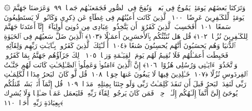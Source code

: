  ۞ وَتَرَكنَا بَعضَهُم يَومَئِذٍۢ يَمُوجُ فِى بَعضٍۢ ۖ وَنُفِخَ فِى ٱلصُّورِ فَجَمَعنَـٰهُم جَمعًۭا ﴿٩٩﴾
 وَعَرَضنَا جَهَنَّمَ يَومَئِذٍۢ لِّلكَـٰفِرِينَ عَرضًا ﴿١٠٠﴾
 ٱلَّذِينَ كَانَت أَعيُنُهُم فِى غِطَآءٍ عَن ذِكرِى وَكَانُوا۟ لَا يَستَطِيعُونَ سَمعًا ﴿١٠١﴾
 أَفَحَسِبَ ٱلَّذِينَ كَفَرُوٓا۟ أَن يَتَّخِذُوا۟ عِبَادِى مِن دُونِىٓ أَولِيَآءَ ۚ إِنَّآ أَعتَدنَا جَهَنَّمَ لِلكَـٰفِرِينَ نُزُلًۭا ﴿١٠٢﴾
 قُل هَل نُنَبِّئُكُم بِٱلأَخسَرِينَ أَعمَـٰلًا ﴿١٠٣﴾
 ٱلَّذِينَ ضَلَّ سَعيُهُم فِى ٱلحَيَوٰةِ ٱلدُّنيَا وَهُم يَحسَبُونَ أَنَّهُم يُحسِنُونَ صُنعًا ﴿١٠٤﴾
 أُو۟لَـٰٓئِكَ ٱلَّذِينَ كَفَرُوا۟ بِـَٔايَـٰتِ رَبِّهِم وَلِقَآئِهِۦ فَحَبِطَت أَعمَـٰلُهُم فَلَا نُقِيمُ لَهُم يَومَ ٱلقِيَـٰمَةِ وَزنًۭا ﴿١٠٥﴾
 ذَٟلِكَ جَزَآؤُهُم جَهَنَّمُ بِمَا كَفَرُوا۟ وَٱتَّخَذُوٓا۟ ءَايَـٰتِى وَرُسُلِى هُزُوًا ﴿١٠٦﴾
 إِنَّ ٱلَّذِينَ ءَامَنُوا۟ وَعَمِلُوا۟ ٱلصَّـٰلِحَـٰتِ كَانَت لَهُم جَنَّـٰتُ ٱلفِردَوسِ نُزُلًا ﴿١٠٧﴾
 خَـٰلِدِينَ فِيهَا لَا يَبغُونَ عَنهَا حِوَلًۭا ﴿١٠٨﴾
 قُل لَّو كَانَ ٱلبَحرُ مِدَادًۭا لِّكَلِمَـٰتِ رَبِّى لَنَفِدَ ٱلبَحرُ قَبلَ أَن تَنفَدَ كَلِمَـٰتُ رَبِّى وَلَو جِئنَا بِمِثلِهِۦ مَدَدًۭا ﴿١٠٩﴾
 قُل إِنَّمَآ أَنَا۠ بَشَرٌۭ مِّثلُكُم يُوحَىٰٓ إِلَىَّ أَنَّمَآ إِلَـٰهُكُم إِلَـٰهٌۭ وَٟحِدٌۭ ۖ فَمَن كَانَ يَرجُوا۟ لِقَآءَ رَبِّهِۦ فَليَعمَل عَمَلًۭا صَـٰلِحًۭا وَلَا يُشرِك بِعِبَادَةِ رَبِّهِۦٓ أَحَدًۢا ﴿١١٠﴾
 
